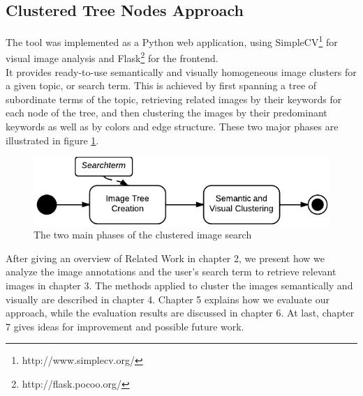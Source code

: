 \subsection{Clustered Tree Nodes Approach}
The tool was implemented as a Python web application, using SimpleCV\footnote{http://www.simplecv.org/} for visual image analysis and Flask\footnote{http://flask.pocoo.org/} for the frontend.\\
It provides ready-to-use semantically and visually homogeneous image clusters for a given topic, or search term. This is achieved by first spanning a tree of subordinate terms of the topic, retrieving related images by their keywords for each node of the tree, and then clustering the images by their predominant keywords as well as by colors and edge structure. These two major phases are illustrated in figure \ref{fig_overallprocess}.

\begin{figure}[h]
\centering
\includegraphics[]{images/search_process_highlevel.pdf}
\caption{The two main phases of the clustered image search}
\label{fig_overallprocess}
\end{figure}

After giving an overview of Related Work in chapter 2, we present how we analyze the image annotations and the user's search term to retrieve relevant images in chapter 3. The methods applied to cluster the images semantically and visually are described in chapter 4. Chapter 5 explains how we evaluate our approach, while the evaluation results are discussed in chapter 6. At last, chapter 7 gives ideas for improvement and possible future work.
